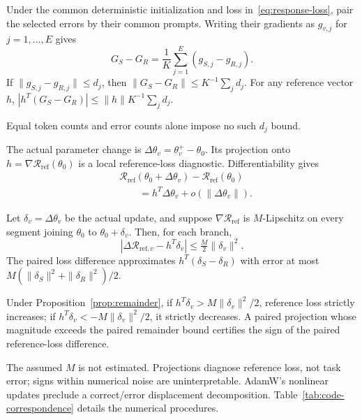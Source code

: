 \begin{proposition}
\label{prop:finite-gap}
Under the common deterministic initialization and loss
in~\eqref{eq:response-loss}, pair the selected errors by their common prompts.
Writing their gradients as $g_{v,j}$ for $j=1,\ldots,E$ gives
\begin{equation}
 G_S-G_R=\frac1K\sum_{j=1}^E(g_{S,j}-g_{R,j}).
 \label{eq:finite-gap}
\end{equation}
If $\|g_{S,j}-g_{R,j}\|\leq d_j$, then
$\|G_S-G_R\|\leq K^{-1}\sum_jd_j$. For any reference vector $h$,
$|h^T(G_S-G_R)|\leq\|h\|K^{-1}\sum_jd_j$.
\end{proposition}
Equal token counts and error counts alone impose no such $d_j$ bound.

The actual parameter change is $\Delta\theta_v=\theta_v^+-\theta_0$.
Its projection onto $h=\nabla\mathcal R_{\mathrm{ref}}(\theta_0)$ is a
local reference-loss diagnostic. Differentiability gives
\begin{equation}
 \begin{aligned}
 &\mathcal R_{\mathrm{ref}}(\theta_0+\Delta\theta_v)
   -\mathcal R_{\mathrm{ref}}(\theta_0)\\
 &\qquad=h^T\Delta\theta_v+o(\|\Delta\theta_v\|).
 \end{aligned}
 \label{eq:projection}
\end{equation}
\begin{proposition}
\label{prop:remainder}
Let $\delta_v=\Delta\theta_v$ be the actual update, and suppose
$\nabla\mathcal R_{\mathrm{ref}}$ is $M$-Lipschitz on every segment joining
$\theta_0$ to $\theta_0+\delta_v$. Then, for each branch,
\begin{equation}
 |\Delta\mathcal R_{\mathrm{ref},v}-h^T\delta_v|
 \leq\tfrac{M}{2}\|\delta_v\|^2.
 \label{eq:remainder}
\end{equation}
The paired loss difference approximates $h^T(\delta_S-\delta_R)$ with error
at most $M(\|\delta_S\|^2+\|\delta_R\|^2)/2$.
\end{proposition}

\begin{corollary}
\label{cor:certificate}
Under Proposition~\ref{prop:remainder}, if
$h^T\delta_v>M\|\delta_v\|^2/2$, reference loss strictly increases; if
$h^T\delta_v<-M\|\delta_v\|^2/2$, it strictly decreases. A paired projection
whose magnitude exceeds the paired remainder bound certifies the sign of
the paired reference-loss difference.
\end{corollary}
The assumed $M$ is not estimated. Projections diagnose reference loss,
not task error; signs within numerical noise are uninterpretable. AdamW's
nonlinear updates preclude a correct/error displacement decomposition.
Table~\ref{tab:code-correspondence} details the numerical procedures.

